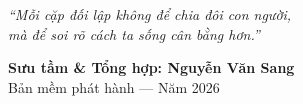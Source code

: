 \begin{titlepage}
\begin{center}
  {\normalsize\itshape\color{midnightblue!90!black}
  ``Mỗi cặp đối lập không để chia đôi con người,\\
   mà để soi rõ cách ta sống cân bằng hơn.''}

  \vfill

  {\fontsize{16}{20}\selectfont\bfseries\color{midnightblue!90!black}
    Sưu tầm \& Tổng hợp: \textbf{Nguyễn Văn Sang}}\\[0.4cm]
  {\small\color{gray} Bản mềm phát hành --- Năm 2026}\\[0.5cm]
\end{center}

\afterpage{\nopagecolor}
\end{titlepage}
